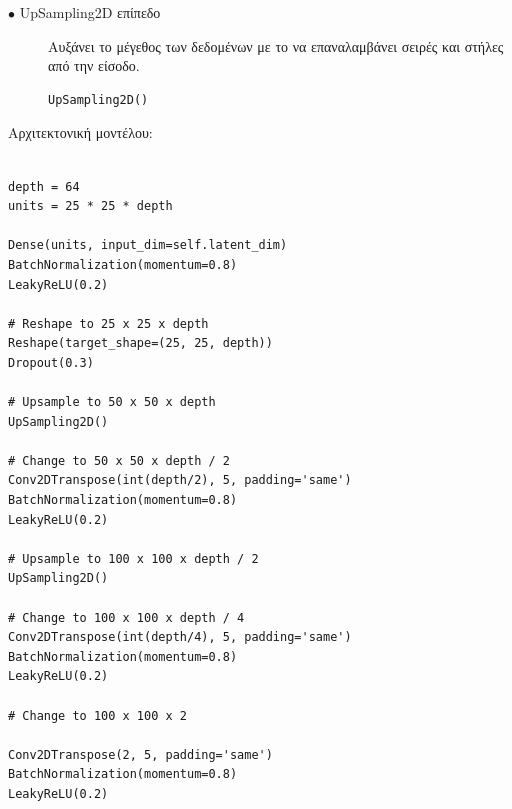 \begin{description}
\item[$\bullet$ UpSampling2D επίπεδο] Αυξάνει το μέγεθος των δεδομένων με το να επαναλαμβάνει σειρές και στήλες από την είσοδο. \cite{upsampling2d}
\begin{verbatim}
UpSampling2D() 
\end{verbatim}
\par
\end{description}

Αρχιτεκτονική μοντέλου:
\begin{verbatim}
        
depth = 64
units = 25 * 25 * depth
        
Dense(units, input_dim=self.latent_dim)
BatchNormalization(momentum=0.8)
LeakyReLU(0.2)

# Reshape to 25 x 25 x depth
Reshape(target_shape=(25, 25, depth))
Dropout(0.3)

# Upsample to 50 x 50 x depth
UpSampling2D()

# Change to 50 x 50 x depth / 2
Conv2DTranspose(int(depth/2), 5, padding='same')
BatchNormalization(momentum=0.8)
LeakyReLU(0.2)

# Upsample to 100 x 100 x depth / 2
UpSampling2D()

# Change to 100 x 100 x depth / 4
Conv2DTranspose(int(depth/4), 5, padding='same')
BatchNormalization(momentum=0.8)
LeakyReLU(0.2)

# Change to 100 x 100 x 2
        
Conv2DTranspose(2, 5, padding='same')
BatchNormalization(momentum=0.8)
LeakyReLU(0.2)
\end{verbatim}

